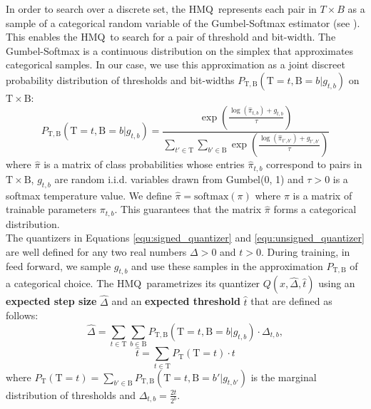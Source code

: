 \documentclass{article}
\newcommand{\bitset}{\mathrm{B}}
\newcommand{\threshset}{\mathrm{T}}
\newcommand{\qb}{HMQ}
\begin{document}
In order to search over a discrete set, the \qb\ represents each pair in $T\times B$ as a sample of a categorical random variable of the Gumbel-Softmax estimator (see \cite{jang2016categorical,maddison2016concrete}).
This enables the \qb\ to search for a pair of threshold and bit-width.
The Gumbel-Softmax is a continuous distribution on the simplex that approximates categorical samples.
In our case, we use this approximation as a joint discreet probability distribution of thresholds and bit-widths \mbox{$P_{\threshset,\bitset}(\threshset\!=\!t,\bitset\!=\!b|g_{t,b})$} on $\threshset\times \bitset$:
\begin{equation}\label{equ:gumbel_softmax_estimator}
P_{\threshset,\bitset}(\threshset=t,\bitset=b|g_{t,b}) = \frac{\exp(\frac{\log(\hat\pi_{t, b} )+g_{t, b}}{\tau})}
{\sum_{t'\in\threshset}\sum_{b'\in\bitset}\exp(\frac{\log(\hat\pi_{t', b'})+g_{t', b'}}{\tau})}
\end{equation}
where $\hat\pi$ is a matrix of class probabilities whose entries $\hat\pi_{t, b}$ correspond to pairs in $\threshset\times \bitset$,
$g_{t, b}$ are random i.i.d. variables drawn from Gumbel(0, 1) and $\tau>0$ is a softmax temperature value.
We define $\hat\pi=\mathrm{softmax}(\pi)$ where $\pi$ is a matrix of trainable parameters $\pi_{t, b}$. This guarantees that the matrix $\hat\pi$ forms a categorical distribution.
\\

The quantizers in Equations \ref{equ:signed_quantizer} and \ref{equ:unsigned_quantizer} are well defined for any two real numbers $\Delta>0$ and $t>0$.
During training, in feed forward, we sample $g_{t,b}$ and use these samples in the approximation $P_{\threshset,\bitset}$ of a categorical choice.
The \qb\ parametrizes its quantizer $Q(x, \hat{\Delta}, \hat{t})$ using an \textbf{expected step size} $\hat{\Delta}$ and an \textbf{expected threshold} $\hat{t}$ that are defined as follows:
\begin{equation}\label{equ:expected_step_size}
\hat{\Delta}=
\sum_{t\in\threshset}\sum_{b\in\bitset}P_{\threshset,\bitset}(\threshset=t,\bitset=b|g_{t,b})\cdot \Delta_{t,b},
\end{equation}
\begin{equation}\label{equ:expected_threshold}
\hat{t}=
\sum_{t\in\threshset}P_{\threshset}(\threshset=t)\cdot t
\end{equation}
where $P_{\threshset}(\threshset=t)=\sum_{b'\in\bitset}P_{\threshset,\bitset}(\threshset=t,\bitset=b'|g_{t,b'})$ is the marginal distribution of thresholds and $\Delta_{t, b} = \frac{2t}{2^{b}}$.
\end{document}
